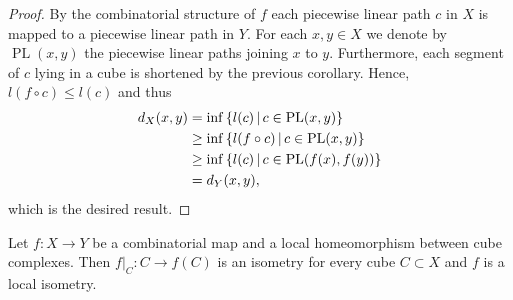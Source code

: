 \begin{proof}
  By the combinatorial structure of \(f\) each piecewise linear path \(c\) in \(X\) is mapped to a piecewise linear path in \(Y\). For each \(x,y \in X\) we denote by \(\operatorname{PL}(x,y)\) the piecewise linear paths joining \(x\) to \(y\). Furthermore, each segment of \(c\) lying in a cube is shortened by the previous corollary. Hence, \(l(f \circ c) \leq l(c)\) and thus
  \begin{align*}
    d_X(x,y)
    & = \inf\left\{l(c) \,\middle|\, c \in \operatorname{PL}(x,y)\right\}\\
    & \geq \inf\left\{l(f \circ c) \,\middle|\, c \in \operatorname{PL}(x,y)\right\}\\
    & \geq \inf\left\{l(c) \,\middle|\, c \in \operatorname{PL}(f(x), f(y))\right\}\\
    & = d_Y(x,y),
  \end{align*}
  which is the desired result.
\end{proof}

\begin{lemma}
  Let \(f\colon X \to Y\) be a combinatorial map and a local homeomorphism between cube complexes. Then \(f|_C\colon C \to f(C)\) is an isometry for every cube \(C \subset X\) and \(f\) is a local isometry.
\end{lemma}

